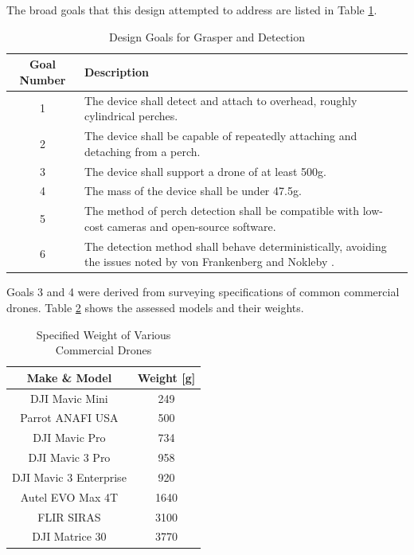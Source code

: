The broad goals that this design attempted to address are listed in Table \ref{tab:design-goals}.

\begin{table}[H]
    \centering
    \caption{Design Goals for Grasper and Detection}
    \begin{tabular}{| c || >{\centering\arraybackslash}m{} |}
        \hline
        Goal Number & Description \\
        \hline
        1 & {The device shall detect and attach to overhead, roughly cylindrical perches.}\\
        2 & {The device shall be capable of repeatedly attaching and detaching from a perch.}\\
        3 & {The device shall support a drone of at least 500g.}\\
        4 & {The mass of the device shall be under 47.5g.}\\
        5 & {The method of perch detection shall be compatible with low-cost cameras and open-source software.}\\
        6 & {The detection method shall behave deterministically, avoiding the issues noted by
        von Frankenberg and Nokleby \cite{von_frankenberg_detection_2020}.}\\
        \hline
    \end{tabular}
    \label{tab:design-goals}
\end{table}


Goals 3 and 4 were derived from surveying specifications of common commercial drones.
Table \ref{tab:drone-weights} shows the assessed models and their weights.

\begin{table}[H]
    \centering
    \caption{Specified Weight of Various Commercial Drones}
    \begin{tabular}{| c || c |}
        \hline
        {Make \& Model} & Weight [g] \\
        \hline
        DJI Mavic Mini & 249 \\
        Parrot ANAFI USA & 500 \\
        DJI Mavic Pro & 734 \\
        DJI Mavic 3 Pro & 958 \\
        DJI Mavic 3 Enterprise & 920 \\
        Autel EVO Max 4T & 1640 \\
        FLIR SIRAS & 3100 \\
        DJI Matrice 30 & 3770 \\
        \hline
    \end{tabular}
    \label{tab:drone-weights}
\end{table}


